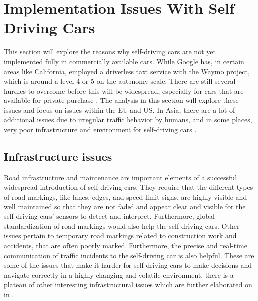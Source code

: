 \section{Implementation Issues With Self Driving Cars} \label{sec:implementationIssuesAV}
This section will explore the reasons why self-driving cars are not yet implemented fully in commercially available cars.
While Google has, in certain areas like California, employed a driverless taxi service with the Waymo project, which is around a level 4 or 5 on the autonomy scale.
There are still several hurdles to overcome before this will be widespread, especially for cars that are available for private purchase \cite{noauthor_waymo_driverless}.
The analysis in this section will explore these issues and focus on issues within the EU and US.
In Asia, there are a lot of additional issues due to irregular traffic behavior by humans, and in some places, very poor infrastructure and environment for self-driving cars \cite{daily_self-driving_2017}.

\subsection{Infrastructure issues}\label{ssec:problemAnalysis-infrastructureIssues}
Road infrastructure and maintenance are important elements of a successful widespread introduction of self-driving cars.
They require that the different types of road markings, like lanes, edges, and speed limit signs, are highly visible and well maintained so that they are not faded and appear clear and visible for the self driving cars' sensors to detect and interpret.
Furthermore, global standardization of road markings would also help the self-driving cars.
Other issues pertain to temporary road markings related to construction work and accidents, that are often poorly marked.
Furthermore, the precise and real-time communication of traffic incidents to the self-driving car is also helpful.
These are some of the issues that make it harder for self-driving cars to make decisions and navigate correctly in a highly changing and volatile environment, there is a plateau of other interesting infrastructural issues which are further elaborated on in \cite{liu_infrastructure-review_2019}.
\cite{liu_infrastructure-review_2019}


